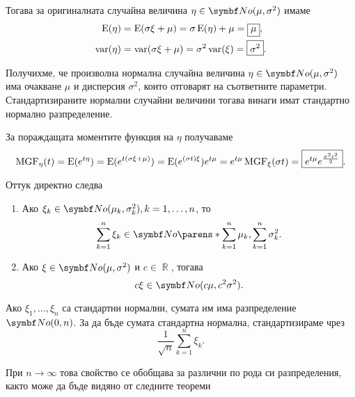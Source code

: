 \documentclass{../../common/topic}
\begin{document}
Тогава за оригиналната случайна величина \( \eta \in \distr{No}(\mu, \sigma^2) \) имаме
\begin{align*}
  \operatorname{E}(\eta) &= \operatorname{E}(\sigma \xi + \mu) = \sigma \operatorname{E}(\eta) + \mu = \boxed{\mu}, \\
  \operatorname{var}(\eta) &= \operatorname{var}(\sigma \xi + \mu) = \sigma^2 \operatorname{var}(\xi) = \boxed{\sigma^2}.
\end{align*}

Получихме, че произволна нормална случайна величина \( \eta \in \distr{No}(\mu, \sigma^2) \) има очакване \( \mu \) и дисперсия \( \sigma^2 \), които отговарят на съответните параметри. Стандартизираните нормални случайни величини тогава винаги имат стандартно нормално разпределение.

За пораждащата моментите функция на \( \eta \) получаваме
\begin{equation*}
  \operatorname{MGF}_\eta(t)
  =
  \operatorname{E}(e^{t\eta})
  =
  \operatorname{E}(e^{t(\sigma\xi + \mu)})
  =
  \operatorname{E}(e^{(\sigma t) \xi}) e^{t\mu}
  =
  e^{t\mu} \operatorname{MGF}_\xi(\sigma t)
  =
  \boxed{e^{t\mu} e^{\frac {\sigma^2 t^2} 2}}.
\end{equation*}

Оттук директно следва
\begin{proposition}\label{thm:normal_distribution_is_stable}
  \hfill
  \begin{enumerate}
    \item Ако \( \xi_k \in \distr{No}(\mu_k, \sigma_k^2), k = 1, \ldots, n \), то
    \begin{equation*}
      \sum_{k=1}^n \xi_k \in \distr{No}\parens*{ \sum_{k=1}^n \mu_k, \sum_{k=1}^n \sigma_k^2 }.
    \end{equation*}

    \item Ако \( \xi \in \distr{No}(\mu, \sigma^2) \) и \( c \in \BbbR \), тогава
    \begin{equation*}
      c \xi \in \distr{No}(c \mu, c^2 \sigma^2).
    \end{equation*}
  \end{enumerate}
\end{proposition}

Ако \( \xi_1, \ldots, \xi_n \) са стандартни нормални, сумата им има разпределение \( \distr{No}(0, n) \). За да бъде сумата стандартна нормална, стандартизираме чрез
\begin{equation*}
  \frac 1 {\sqrt n} \sum_{k=1}^n \xi_k.
\end{equation*}

При \( n \to \infty \) това свойство се обобщава за различни по рода си разпределения, както може да бъде видяно от следните теореми
\end{document}
